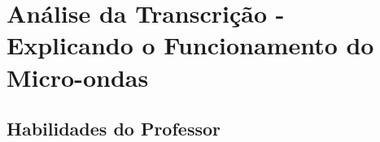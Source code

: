 \chapter{Análise da Transcrição - Explicando o Funcionamento do Micro-ondas}
\label{chap: transc}



\section{Habilidades do Professor}
\label{subsec: transcHabProf}

